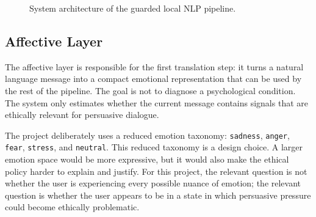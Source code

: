 \documentclass[11pt,a4paper]{article}
\newcommand{\code}[1]{\texttt{#1}}
\begin{document}
\begin{figure}[htbp]
\centering
{}
\caption{System architecture of the guarded local NLP pipeline.}
\label{fig:architecture}
\end{figure}

\subsection{Affective Layer}

The affective layer is responsible for the first translation step: it turns a natural
language message into a compact emotional representation that can be used by the rest of the
pipeline. The goal is not to diagnose a psychological condition. The system only estimates
whether the current message contains signals that are ethically relevant for persuasive
dialogue.

The project deliberately uses a reduced emotion taxonomy:
\code{sadness}, \code{anger}, \code{fear}, \code{stress}, and \code{neutral}. This reduced
taxonomy is a design choice. A larger emotion space would be more expressive, but it would
also make the ethical policy harder to explain and justify. For this project, the relevant
question is not whether the user is experiencing every possible nuance of emotion; the
relevant question is whether the user appears to be in a state in which persuasive pressure
could become ethically problematic.
\end{document}
